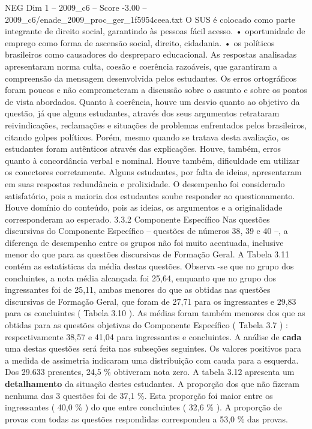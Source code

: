 \begin{textsample}{NEG Dim 1 – 2009\_c6 – Score -3.00 – 2009\_c6/enade\_2009\_proc\_ger\_1f5954ceea.txt}
O SUS é colocado como parte integrante de direito social, garantindo às pessoas fácil acesso. • oportunidade de emprego como forma de ascensão social, direito, cidadania. • os políticos brasileiros como causadores do despreparo educacional.
As respostas analisadas apresentaram norma culta, coesão e coerência razoáveis, que garantiram a compreensão da mensagem desenvolvida pelos estudantes.
Os erros ortográficos foram poucos e não comprometeram a discussão sobre o assunto e sobre os pontos de vista abordados.
Quanto à coerência, houve um desvio quanto ao objetivo da questão, já que alguns estudantes, através dos seus argumentos retrataram reivindicações, reclamações e situações de problemas enfrentados pelos brasileiros, citando golpes políticos.
Porém, mesmo quando se tratava desta avaliação, os estudantes foram autênticos através das explicações.
Houve, também, erros quanto à concordância verbal e nominal.
Houve também, dificuldade em utilizar os conectores corretamente.
Alguns estudantes, por falta de ideias, apresentaram em suas respostas redundância e prolixidade.
O desempenho foi considerado satisfatório, pois a maioria dos estudantes soube responder ao questionamento.
Houve domínio do conteúdo, pois as ideias, os argumentos e a originalidade corresponderam ao esperado. 3.3.2 Componente Específico Nas questões discursivas do Componente Específico – questões de números 38, 39 e 40 –, a diferença de desempenho entre os grupos não foi muito acentuada, inclusive menor do que para as questões discursivas de Formação Geral.
A Tabela 3.11 contém as estatísticas da média destas questões.
Observa -se que no grupo dos concluintes, a nota média alcançada foi 25,64, enquanto que no grupo dos ingressantes foi de 25,11, ambas menores do que as obtidas nas questões discursivas de Formação Geral, que foram de 27,71 para os ingressantes e 29,83 para os concluintes ( Tabela 3.10 ).
As médias foram também menores dos que as obtidas para as questões objetivas do Componente Específico ( Tabela 3.7 ) : respectivamente 38,57 e 41,04 para ingressantes e concluintes.
A análise de \textbf{cada} uma destas questões será feita nas subseções seguintes.
Os valores positivos para a medida de assimetria indicaram uma distribuição com cauda para a esquerda.
Dos 29.633 presentes, 24,5 \% obtiveram nota zero.
A tabela 3.12 apresenta um \textbf{detalhamento} da situação destes estudantes.
A proporção dos que não fizeram nenhuma das 3 questões foi de 37,1 \%.
Esta proporção foi maior entre os ingressantes ( 40,0 \% ) do que entre concluintes ( 32,6 \% ).
A proporção de provas com todas as questões respondidas correspondeu a 53,0 \% das provas.

\end{textsample}
